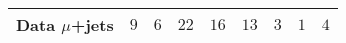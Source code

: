 \begin{table}[ht!]
\begin{tabular}{ lllllllll }
Data $\mu$+jets\B       & $9$                            & $6$                            & $22$                           & $16$                           & $13$                           & $3$                            & $1$                            & $4$                            \\ 
\hline
\end{tabular}
\end{table}

